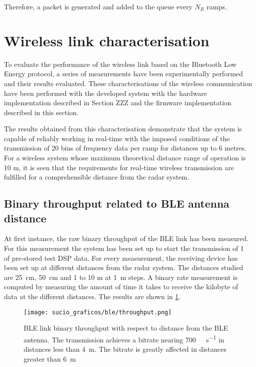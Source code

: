Therefore, a packet is generated and added to the queue every $N_R$ ramps.

\section{Wireless link characterisation} \label{sec:ble_characterisation}

To evaluate the performance of the wireless link based on the Bluetooth Low Energy protocol, a series of measurements have been experimentally performed and their results evaluated. These characterisations of the wireless communication have been performed with the developed system with the hardware implementation described in Section ZZZ and the firmware implementation described in this section.

The results obtained from this characterisation demonstrate that the system is capable of reliably working in real-time with the imposed conditions of the transmission of 20 bins of frequency data per ramp for distances up to 6 metres. For a wireless system whose maximum theoretical distance range of operation is 10 m, it is seen that the requirements for real-time wireless transmission are fulfilled for a comprehensible distance from the radar system.


\subsection{Binary throughput related to BLE antenna distance}

At first instance, the raw binary throughput of the BLE link has been measured. For this measurement the system has been set up to start the transmission of \SI{1}{\kilo\byte} of pre-stored test DSP data. For every measurement, the receiving device has been set up at different distances from the radar system. The distances studied are \SI{25}{\centi\metre}, \SI{50}{\centi\metre} and 1 to 10 \si{\metre} at \SI{1}{\metre} steps. A binary rate measurement is computed by measuring the amount of time it takes to receive the kilobyte of data at the different distances. The results are shown in \cref{fig:firmware_ble_char_bitrate}.

\begin{figure}[ht]
	\centering
	\texttt{[image: sucio\_graficos/ble/throughput.png]}
	\caption{BLE link binary throughput with respect to distance from the BLE antenna. The transmission achieves a bitrate nearing \SI{700}{\kilo\bit\per\second} in distances less than \SI{4}{\meter}. The bitrate is greatly affected in distances greater than \SI{6}{\meter}}
	\label{fig:firmware_ble_char_bitrate}
\end{figure}

